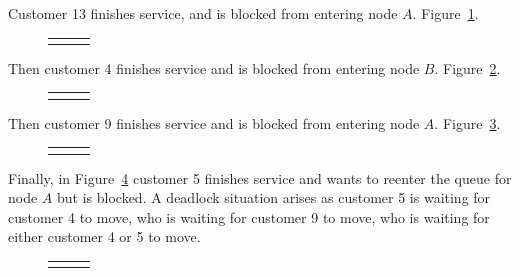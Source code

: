 \documentclass{article}
\begin{document}
Customer 13 finishes service, and is blocked from entering node $A$. Figure~\ref{fig:general_buildup_2}.

\begin{figure}[H]
  \begin{tabular}{ c c c }
       & \hspace{0.1\textwidth} &
       \\
  \end{tabular}
  \caption{}
  \label{fig:general_buildup_2}
\end{figure}

Then customer 4 finishes service and is blocked from entering node $B$. Figure~\ref{fig:general_buildup_3}.

\begin{figure}[H]
  \begin{tabular}{ c c c }
       & \hspace{0.1\textwidth} &
       \\
  \end{tabular}
  \caption{}
  \label{fig:general_buildup_3}
\end{figure}

Then customer 9 finishes service and is blocked from entering node $A$. Figure~\ref{fig:general_buildup_4}.

\begin{figure}[H]
  \begin{tabular}{ c c c }
       & \hspace{0.1\textwidth} &
       \\
  \end{tabular}
  \caption{}
  \label{fig:general_buildup_4}
\end{figure}

Finally, in Figure~\ref{fig:general_buildup_5} customer 5 finishes service and wants to reenter the queue for node $A$ but is blocked.
A deadlock situation arises as customer 5 is waiting for customer 4 to move, who is waiting for customer 9 to move, who is waiting for either customer 4 or 5 to move.

\begin{figure}[H]
  \begin{tabular}{ c c c }
       & \hspace{0.1\textwidth} &
       \\
  \end{tabular}
  \caption{}
  \label{fig:general_buildup_5}
\end{figure}
\end{document}
